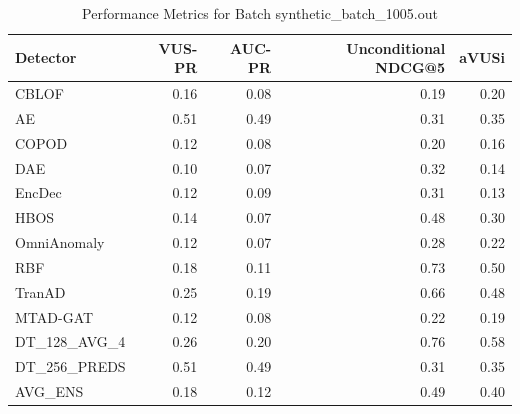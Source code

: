 \begin{table}
\centering
\caption{Performance Metrics for Batch synthetic_batch_1005.out}
\label{tab:example_metrics}
\begin{tabular}{lrrrr}
\toprule
    Detector &  VUS-PR &  AUC-PR &  Unconditional NDCG@5 &  aVUSi \\
\midrule
       CBLOF &    0.16 &    0.08 &                  0.19 &   0.20 \\
          AE &    0.51 &    0.49 &                  0.31 &   0.35 \\
       COPOD &    0.12 &    0.08 &                  0.20 &   0.16 \\
         DAE &    0.10 &    0.07 &                  0.32 &   0.14 \\
      EncDec &    0.12 &    0.09 &                  0.31 &   0.13 \\
        HBOS &    0.14 &    0.07 &                  0.48 &   0.30 \\
 OmniAnomaly &    0.12 &    0.07 &                  0.28 &   0.22 \\
         RBF &    0.18 &    0.11 &                  0.73 &   0.50 \\
      TranAD &    0.25 &    0.19 &                  0.66 &   0.48 \\
    MTAD-GAT &    0.12 &    0.08 &                  0.22 &   0.19 \\
DT\_128\_AVG\_4 &    0.26 &    0.20 &                  0.76 &   0.58 \\
DT\_256\_PREDS &    0.51 &    0.49 &                  0.31 &   0.35 \\
     AVG\_ENS &    0.18 &    0.12 &                  0.49 &   0.40 \\
\bottomrule
\end{tabular}
\end{table}

